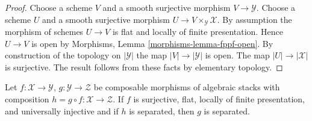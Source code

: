 \begin{proof}
Choose a scheme $V$ and a smooth surjective morphism $V \to \mathcal{Y}$.
Choose a scheme $U$ and a smooth surjective morphism
$U \to V \times_\mathcal{Y} \mathcal{X}$. By assumption the morphism
of schemes $U \to V$ is flat and locally of finite presentation.
Hence $U \to V$ is open by
Morphisms, Lemma \ref{morphisms-lemma-fppf-open}.
By construction of the topology on $|\mathcal{Y}|$ the map
$|V| \to |\mathcal{Y}|$ is open.
The map $|U| \to |\mathcal{X}|$ is surjective.
The result follows from these facts by elementary topology.
\end{proof}

\begin{lemma}
\label{lemma-check-separated-on-ui-cover}
Let $f : \mathcal{X} \to \mathcal{Y}$, $g : \mathcal{Y} \to \mathcal{Z}$
be composable morphisms of algebraic stacks with composition
$h = g \circ f : \mathcal{X} \to \mathcal{Z}$.
If $f$ is surjective, flat, locally of finite presentation,
and universally injective and if $h$ is separated, then
$g$ is separated.
\end{lemma}

